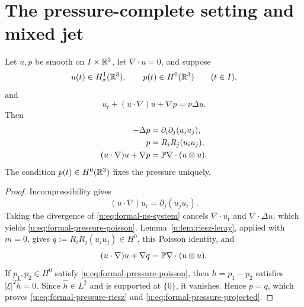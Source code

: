 \section{The pressure-complete setting and mixed jet}
\label{u:sec:formal-setting-mixed-jet}

\begin{proposition}
\label{u:prop:formal-pressure-normalization}
Let \(u,p\) be smooth on \(I\times\mathbb R^3\), let \(\nabla\cdot u=0\), and suppose
\[
 u(t)\in H^1_\sigma(\mathbb R^3),
 \qquad
 p(t)\in H^0(\mathbb R^3)
 \qquad(t\in I),
\]
and
\begin{equation}
 u_t+(u\cdot\nabla)u+\nabla p=\nu\Delta u.
 \label{u:eq:formal-ns-system}
\end{equation}
Then
\begin{align}
 -\Delta p
 &=\partial_i\partial_j(u_i u_j),
 \label{u:eq:formal-pressure-poisson}\\
 p
 &=R_iR_j(u_i u_j),
 \label{u:eq:formal-pressure-riesz}\\
 (u\cdot\nabla)u+\nabla p
 &=\mathbb P\nabla\cdot(u\otimes u).
 \label{u:eq:formal-pressure-projected}
\end{align}
The condition \(p(t)\in H^0(\mathbb R^3)\) fixes the pressure uniquely.
\end{proposition}

\begin{proof}
Incompressibility gives
\[
 (u\cdot\nabla)u_i=\partial_j(u_j u_i).
\]
Taking the divergence of \eqref{u:eq:formal-ns-system} cancels
\(\nabla\cdot u_t\) and \(\nabla\cdot\Delta u\), which yields
\eqref{u:eq:formal-pressure-poisson}.  Lemma~\ref{u:lem:riesz-leray}, applied
with \(m=0\), gives \(q:=R_iR_j(u_i u_j)\in H^0\), this Poisson identity, and
\[
 (u\cdot\nabla)u+\nabla q=\mathbb P\nabla\cdot(u\otimes u).
\]
If \(p_1,p_2\in H^0\) satisfy \eqref{u:eq:formal-pressure-poisson}, then
\(h=p_1-p_2\) satisfies
\(|\xi|^2\widehat h=0\).  Since \(\widehat h\in L^2\) and is supported at
\(\{0\}\), it vanishes.  Hence \(p=q\), which proves
\eqref{u:eq:formal-pressure-riesz} and \eqref{u:eq:formal-pressure-projected}.
\end{proof}

